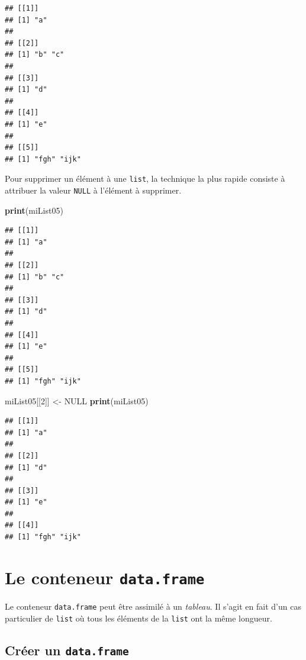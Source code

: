 \documentclass[]{book}
\newenvironment{Shaded}{\begin{snugshade}}{\end{snugshade}}
\newcommand{\DecValTok}[1]{\textcolor[rgb]{0.00,0.00,0.81}{#1}}
\newcommand{\KeywordTok}[1]{\textcolor[rgb]{0.13,0.29,0.53}{\textbf{#1}}}
\newcommand{\NormalTok}[1]{#1}
\newcommand{\OtherTok}[1]{\textcolor[rgb]{0.56,0.35,0.01}{#1}}
\newcommand{\StringTok}[1]{\textcolor[rgb]{0.31,0.60,0.02}{#1}}
\begin{document}
\begin{verbatim}
## [[1]]
## [1] "a"
## 
## [[2]]
## [1] "b" "c"
## 
## [[3]]
## [1] "d"
## 
## [[4]]
## [1] "e"
## 
## [[5]]
## [1] "fgh" "ijk"
\end{verbatim}

Pour supprimer un élément à une \texttt{list}, la technique la plus rapide consiste à attribuer la valeur \texttt{NULL} à l'élément à supprimer.

\begin{Shaded}
\begin{Highlighting}[]
\KeywordTok{print}\NormalTok{(miList05)}
\end{Highlighting}
\end{Shaded}

\begin{verbatim}
## [[1]]
## [1] "a"
## 
## [[2]]
## [1] "b" "c"
## 
## [[3]]
## [1] "d"
## 
## [[4]]
## [1] "e"
## 
## [[5]]
## [1] "fgh" "ijk"
\end{verbatim}

\begin{Shaded}
\begin{Highlighting}[]
\NormalTok{miList05[[}\DecValTok{2}\NormalTok{]] <-}\StringTok{ }\OtherTok{NULL}
\KeywordTok{print}\NormalTok{(miList05)}
\end{Highlighting}
\end{Shaded}

\begin{verbatim}
## [[1]]
## [1] "a"
## 
## [[2]]
## [1] "d"
## 
## [[3]]
## [1] "e"
## 
## [[4]]
## [1] "fgh" "ijk"
\end{verbatim}

\hypertarget{l014dataframe}{%
\section{\texorpdfstring{Le conteneur \texttt{data.frame}}{Le conteneur data.frame}}\label{l014dataframe}}

Le conteneur \texttt{data.frame} peut être assimilé à un \emph{tableau}. Il s'agit en fait d'un cas particulier de \texttt{list} où tous les éléments de la \texttt{list} ont la même longueur.

\hypertarget{creer-un-data.frame}{%
\subsection{\texorpdfstring{Créer un \texttt{data.frame}}{Créer un data.frame}}\label{creer-un-data.frame}}
\end{document}
